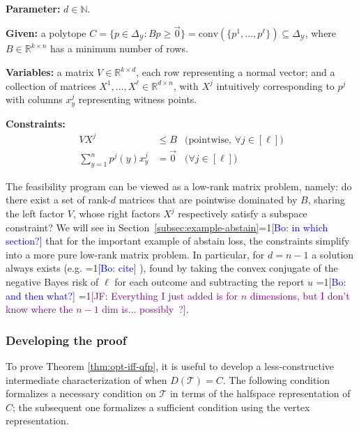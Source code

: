 \documentclass[anon]{colt2020} %
\newcommand{\Comments}{1}
\newcommand{\mynote}[2]{\ifnum\Comments=1\textcolor{#1}{#2}\fi}
\newcommand{\jessie}[1]{\mynote{purple}{[JF: #1]}}
\newcommand{\bo}[1]{\mynote{blue}{[Bo: #1]}}
\newcommand{\reals}{\mathbb{R}}
\newcommand{\simplex}{\Delta_\Y}
\newcommand{\T}{\mathcal{T}}
\newcommand{\Y}{\mathcal{Y}}
\newcommand{\conv}{\mathrm{conv}}
\begin{document}
\begin{definition} \label{def:qfp} ~ \\
  \indent \textbf{Parameter:} $d \in \mathbb{N}$.

  \textbf{Given:} a polytope $C = \{p \in \simplex : Bp \geq \vec 0\} = \conv(\{p^1, \ldots, p^\ell\}) \subseteq \simplex$, where $B \in \reals^{k \times n}$ has a minimum number of rows.

  \textbf{Variables:} a matrix $V \in \reals^{k \times d}$, each row representing a normal vector; and a collection of matrices $X^1,\ldots,X^{\ell} \in \reals^{d \times n}$, with $X^j$ intuitively corresponding to $p^j$ with columns $x^j_y$ representing witness points.

  \textbf{Constraints:}
    \begin{align}
      V X^j                     &\leq B    & \text{(pointwise, $\forall j \in [\ell]$)}  \label{eqn:qp-constr-1} \\
      \sum_{y=1}^n p^j(y) x^j_y &= \vec 0  & \text{($\forall j \in [\ell]$)}    \label{eqn:qp-constr-2}
    \end{align}
\end{definition}

The feasibility program can be viewed as a low-rank matrix problem, namely: do there exist a set of rank-$d$ matrices that are pointwise dominated by $B$, sharing the left factor $V$, whose right factors $X^j$ respectively satisfy a subspace constraint?
We will see in Section~\ref{subsec:example-abstain}\bo{in which section?} that for the important example of abstain loss, the constraints simplify into a more pure low-rank matrix problem.
In particular, for $d=n-1$ a solution always exists (e.g. \bo{cite} \cite[Theorem 2]{finocchiaro2019embedding}), found by taking the convex conjugate of the negative Bayes risk of $\ell$ for each outcome and subtracting the report $u$ \bo{and then what?} \jessie{Everything I just added is for $n$ dimensions, but I don't know where the $n-1$ dim is... possibly~\cite{abernethy2013efficient}?}.


\subsubsection{Developing the proof}

To prove Theorem \ref{thm:opt-iff-qfp}, it is useful to develop a less-constructive intermediate characterization of when $D(\T) = C$.
The following condition formalizes a necessary condition on $\T$ in terms of the halfspace representation of $C$; the subsequent one formalizes a sufficient condition using the vertex representation.
\end{document}

